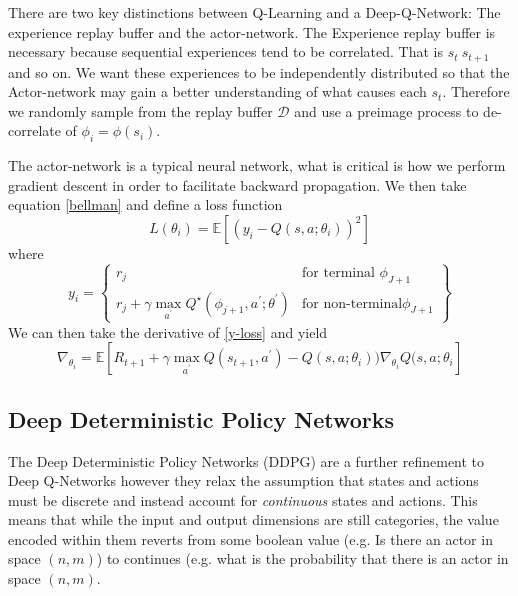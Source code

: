 \documentclass[doc, onecolumn, 12pt]{apa6}
\begin{document}
There are two key distinctions between Q-Learning and a Deep-Q-Network: The experience replay buffer and the actor-network. The Experience replay buffer is necessary because sequential experiences tend to be correlated. That is $s_{t} ~ s_{t+1}$ and so on.  We want these experiences to be independently distributed so that the Actor-network may gain a better understanding of what causes each $s_{t}$. Therefore we randomly sample from the replay buffer $\mathcal{D}$ and use a preimage process to de-correlate of $\phi_{i} = \phi(s_{i})$. 

The actor-network is a typical neural network, what is critical is how we perform gradient descent in order to facilitate backward propagation. We then take equation \ref{bellman} and define a loss function \begin{equation}
\label{loss-dqn}
L(\theta_{i}) = \mathbb{E}  \left[ (y_{i} -Q(s,a;\theta_{i}))^{2} \right]
\end{equation} 
where \begin{equation} \label{y-loss}
y_{i} = 
		\left\{\begin{array}{lr}
		 r_{j}  & \text{for terminal }  \phi_{J+1} \\
		r_{j} + \gamma  \max_{a ^{\prime}} Q^{\star} (\phi_{j+1}, a^{\prime}; \theta^{\prime})  &  \text{for non-terminal}  \phi_{J+1} 
		\end{array} \right\}
\end{equation}
We can then take the derivative of \ref{y-loss} and yield \begin{equation}
\label{loss-actor}
\nabla_{\theta_{i}} = \mathbb{E} \left[R_{t+1} + \gamma \max_{a^{\prime}} Q(s_{t+1},a^{\prime})-Q(s,  a; \theta_{i}))\nabla_{\theta_{i}}Q(s,a; \theta_{i} \right] 
\end{equation}

\FloatBarrier
\subsection{Deep Deterministic Policy Networks}
The Deep Deterministic Policy Networks (DDPG) are a further refinement to Deep Q-Networks however they relax the assumption that states and actions must be discrete and instead account for \emph{continuous} states and actions. This means that while the input and output dimensions are still categories, the value encoded within them reverts from some boolean value (e.g. Is there an actor in space $(n,m)$) to continues (e.g. what is the probability that there is an actor in space $(n,m)$. 
\end{document}
